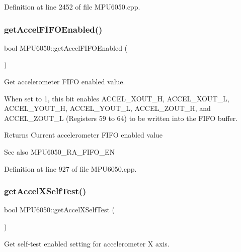 Definition at line 2452 of file M\+P\+U6050.\+cpp.

\mbox{\label{classMPU6050_ace244415128ad7a38293ad6808b7face}} 
\subsubsection{\texorpdfstring{getAccelFIFOEnabled()}{getAccelFIFOEnabled()}}
{\footnotesize\ttfamily bool M\+P\+U6050\+::get\+Accel\+F\+I\+F\+O\+Enabled (\begin{DoxyParamCaption}{ }\end{DoxyParamCaption})}



Get accelerometer F\+I\+FO enabled value. 

When set to 1, this bit enables A\+C\+C\+E\+L\+\_\+\+X\+O\+U\+T\+\_\+H, A\+C\+C\+E\+L\+\_\+\+X\+O\+U\+T\+\_\+L, A\+C\+C\+E\+L\+\_\+\+Y\+O\+U\+T\+\_\+H, A\+C\+C\+E\+L\+\_\+\+Y\+O\+U\+T\+\_\+L, A\+C\+C\+E\+L\+\_\+\+Z\+O\+U\+T\+\_\+H, and A\+C\+C\+E\+L\+\_\+\+Z\+O\+U\+T\+\_\+L (Registers 59 to 64) to be written into the F\+I\+FO buffer. \begin{DoxyReturn}{Returns}
Current accelerometer F\+I\+FO enabled value 
\end{DoxyReturn}
\begin{DoxySeeAlso}{See also}
M\+P\+U6050\+\_\+\+R\+A\+\_\+\+F\+I\+F\+O\+\_\+\+EN 
\end{DoxySeeAlso}


Definition at line 927 of file M\+P\+U6050.\+cpp.

\mbox{\label{classMPU6050_a8fc7eab1302281f6e4bc953379f3237b}} 
\subsubsection{\texorpdfstring{getAccelXSelfTest()}{getAccelXSelfTest()}}
{\footnotesize\ttfamily bool M\+P\+U6050\+::get\+Accel\+X\+Self\+Test (\begin{DoxyParamCaption}{ }\end{DoxyParamCaption})}



Get self-\/test enabled setting for accelerometer X axis. 

